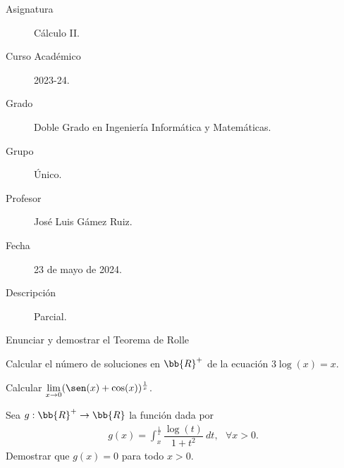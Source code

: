 \documentclass[12pt]{article}
\begin{document}

    
    

    \begin{description}
        \item[Asignatura] Cálculo II.
        \item[Curso Académico] 2023-24.
        \item[Grado] Doble Grado en Ingeniería Informática y Matemáticas.
        \item[Grupo] Único.
        \item[Profesor] José Luis Gámez Ruiz.
        \item[Fecha] 23 de mayo de 2024.
        \item[Descripción] Parcial.
    \end{description}
    \newpage

    \begin{ejercicio}
        Enunciar y demostrar el Teorema de Rolle        
    \end{ejercicio}

    \begin{ejercicio}
        Calcular el número de soluciones en $\bb{R}^+$ de la ecuación $3 \log(x)=x$.
    \end{ejercicio}

    \begin{ejercicio}
        Calcular $\lim\limits_{x \to 0} (\sen(x)+\cos(x))^{\frac{1}{x}}$.
    \end{ejercicio}

    \begin{ejercicio}
        Sea $g:\bb{R}^+ \rightarrow \bb{R}$ la función dada por 
        \begin{gather*}
            g(x)= \int_{x}^{\frac{1}{x}} \dfrac{\log(t)}{1+t^2}~dt, \ \ \ \forall x > 0.
        \end{gather*}
        Demostrar que $g(x)=0$ para todo $x>0$.
    \end{ejercicio}
   
\end{document}
